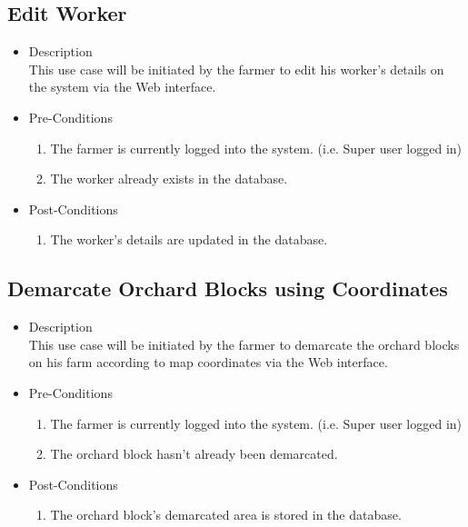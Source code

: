 \documentclass[11pt,fleqn]{book} %
\begin{document}
		\subsection{Edit Worker}
		\begin{itemize}
			\item Description\\
			This use case will be initiated by the farmer to edit his worker’s details on the system via the Web interface.
			\item Pre-Conditions
			\begin{enumerate}
				\item The farmer is currently logged into the system. (i.e. Super user logged in)
				\item The worker already exists in the database.					
			\end{enumerate}
			\item Post-Conditions
			\begin{enumerate}
				\item The worker’s details are updated in the database.
			\end{enumerate}
		\end{itemize}
		
		\subsection{Demarcate Orchard Blocks using Coordinates}
		\begin{itemize}
			\item Description\\
			This use case will be initiated by the farmer to demarcate the orchard blocks on his farm according to map coordinates via the Web interface.
			\item Pre-Conditions
			\begin{enumerate}
				\item The farmer is currently logged into the system. (i.e. Super user logged in)
				\item The orchard block hasn’t already been demarcated.
			\end{enumerate}
			\item Post-Conditions
			\begin{enumerate}
				\item The orchard block’s demarcated area is stored in the database.		
			\end{enumerate}
		\end{itemize}
		
\end{document}
